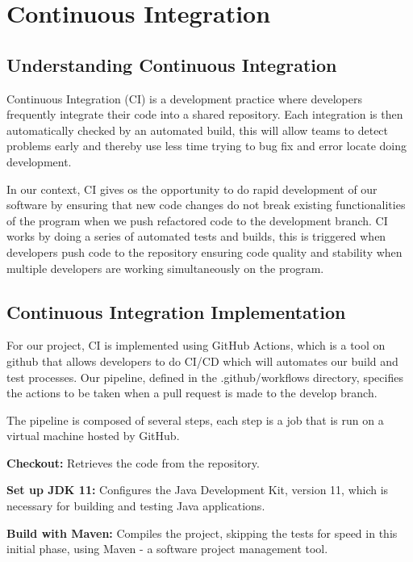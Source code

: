 \section{Continuous Integration}

\subsection{Understanding Continuous Integration}

Continuous Integration (CI) is a development practice where developers frequently integrate their code into a shared repository.
Each integration is then automatically checked by an automated build, this will allow teams to detect problems early and thereby use less time trying to bug fix
and error locate doing development.

In our context, CI gives os the opportunity to do rapid development of our software by ensuring that new code changes do not break existing functionalities of the program when
we push refactored code to the development branch.
CI works by doing a series of automated tests and builds, this is triggered when developers push code to the repository ensuring code quality and stability when multiple
developers are working simultaneously on the program.

\subsection{Continuous Integration Implementation}
For our project, CI is implemented using GitHub Actions, which is a tool on github that allows developers to do CI/CD which will automates our build and test processes.
Our pipeline, defined in the .github/workflows directory, specifies the actions to be taken when a pull request is made to the develop branch.

The pipeline is composed of several steps, each step is a job that is run on a virtual machine hosted by GitHub.

\textbf{Checkout:} Retrieves the code from the repository.

\textbf{Set up JDK 11:} Configures the Java Development Kit, version 11, which is necessary for building and testing Java applications.

\textbf{Build with Maven:} Compiles the project, skipping the tests for speed in this initial phase, using Maven - a software project management tool.

